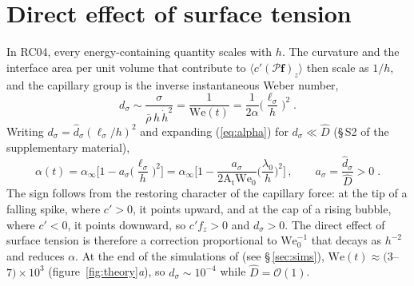 \documentclass[lineno]{jfm}
\newcommand{\avg}[1]{\langle #1\rangle}
\newcommand{\At}{\mathrm{A_t}}
\newcommand{\We}{\mathrm{We}_0}
\newcommand{\lls}{\ell_\sigma}
\newcommand{\hd}{\dot h}
\begin{document}
\section{Direct effect of surface tension}\label{sec:direct}

In RC04, every energy-containing quantity scales with $h$. The curvature and the interface area per unit volume that contribute to $\avg{c' (\mathcal P \mathbf f)_z}$ then scale as $1/h$, and the capillary group is the inverse instantaneous Weber number,
\begin{equation}
  d_\sigma \sim \frac{\sigma}{\bar\rho \, h \, \hd^2} = \frac{1}{\mathrm{We}(t)} = \frac{1}{2 \alpha} \Big(\frac{\lls}{h}\Big)^2 \;.
  \label{eq:dsigma}
\end{equation}
Writing $d_\sigma = \hat d_\sigma (\lls/h)^2$ and expanding (\ref{eq:alpha}) for $d_\sigma \ll \hat D$ (\S\,S2 of the supplementary material),
\begin{equation}
  \alpha(t) = \alpha_\infty \Big[1 - a_\sigma \Big(\frac{\lls}{h}\Big)^2\Big] = \alpha_\infty \Big[1 - \frac{a_\sigma}{2 \At \We} \Big(\frac{\lambda_0}{h}\Big)^2\Big] \, , \qquad a_\sigma = \frac{\hat d_\sigma}{\hat D} > 0 \;.
  \label{eq:direct}
\end{equation}
The sign follows from the restoring character of the capillary force: at the tip of a falling spike, where $c' > 0$, it points upward, and at the cap of a rising bubble, where $c' < 0$, it points downward, so $c' f_z > 0$ and $d_\sigma > 0$. The direct effect of surface tension is therefore a correction proportional to $\We^{-1}$ that decays as $h^{-2}$ and reduces $\alpha$. At the end of the simulations of \citet{Walker2025,Walker2026,Walker2027_1} (see \S\,\ref{sec:sims}), $\mathrm{We}(t) \approx (3$--$7) \times 10^3$ (figure~\ref{fig:theory}\textit{a}), so $d_\sigma \sim 10^{-4}$ while $\hat D = \mathcal{O}(1)$.
\end{document}
